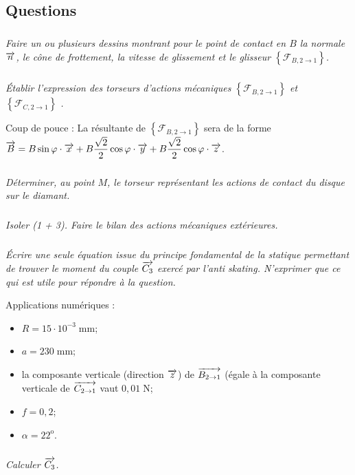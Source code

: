 \documentclass[10pt,fleqn]{article} %
\begin{document}
\begin{multicols}{2}
\subsection*{Questions}

\subparagraph{} \textit{Faire un ou plusieurs dessins montrant pour le point de contact en $B$ la normale $\overrightarrow{n}$, le cône de frottement, la vitesse de glissement et le glisseur $\left\{ \mathcal{F}_{B,2\rightarrow 1}\right\}$.}

\subparagraph{} \textit{Établir l'expression des torseurs d'actions mécaniques
 $\left\{ \mathcal{F}_{B,2\rightarrow 1}\right\}$ et
 $\left\{ \mathcal{F}_{C,2\rightarrow 1}\right\}$ .}

\begin{rem}
Coup de pouce : 
La résultante de $\left\{ \mathcal{F}_{B,2\rightarrow 1}\right\}$ sera de la forme $\overrightarrow{B} = B\sin \varphi \cdot \overrightarrow{x} +  B\dfrac{\sqrt{2}}{2} \cos \varphi  \cdot \overrightarrow{y} +  B\dfrac{\sqrt{2}}{2} \cos \varphi  \cdot \overrightarrow{z}$.
\end{rem}


\subparagraph{} \textit{Déterminer, au point $M$, le torseur représentant les actions de contact du disque sur le diamant.}

\subparagraph{} \textit{Isoler (1 + 3). Faire le bilan des actions mécaniques extérieures.}


\subparagraph{} \textit{Écrire une seule équation issue du principe fondamental de la statique permettant de trouver le moment du couple $\overrightarrow{C_3}$  exercé par l'anti skating. N'exprimer que ce qui est utile pour répondre à la question.}

Applications numériques : 
\begin{itemize}
\item $R = 15\cdot 10^{-3} \; \text{mm}$;
\item $a = 230 \; \text{mm}$;
\item la composante verticale (direction $\overrightarrow{z}$) de $\overrightarrow{B_{2\rightarrow 1}}$ (égale à la composante verticale de $\overrightarrow{C_{2\rightarrow 1}}$ vaut $0,01 \; \text{N}$;
\item $f=0,2$;
\item $\alpha = 22^{\text{o}}$.
\end{itemize}

\subparagraph{}
\textit{Calculer  $\overrightarrow{C_3}$.}


\end{multicols}
\end{document}
